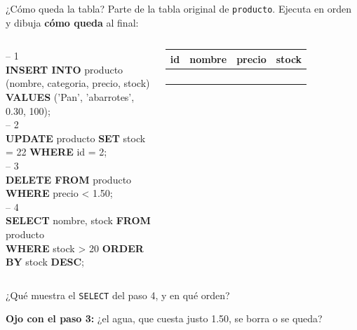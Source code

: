 \documentclass[aspectratio=169,10pt,c]{beamer}
\newcommand{\bl}[1][1.9cm]{\underline{\hspace{#1}}}
\newcommand{\tbl}[1]{\textcolor{utpNaranja}{\texttt{#1}}}
\newcommand{\kw}[1]{\textcolor{utpRojo}{\textbf{#1}}}
\newcommand{\com}[1]{\textcolor{utpGris}{-- #1}}
\newcommand{\ins}[1]{\tikz[baseline=-0.5ex]{\node[rounded corners=2pt,fill=utpRojo,text=white,
  font=\bfseries\scriptsize,inner xsep=5pt,inner ysep=2.5pt] {#1};}}
\newenvironment{sqlcode}[1][.86\textwidth]
  {\begin{center}\begin{lrbox}{\sqlbuf}\begin{minipage}{#1}\ttfamily\footnotesize\vspace{6pt}\raggedright}
  {\vspace{6pt}\end{minipage}\end{lrbox}\colorbox{utpGrisClaro}{\usebox{\sqlbuf}}\end{center}}
\begin{document}
\begin{frame}{\ins{Práctica 7} ¿Cómo queda la tabla?}
\small Parte de la tabla original de \tbl{producto}. Ejecuta en orden y dibuja \textbf{cómo queda} al final:
\vspace{0.2cm}
\begin{columns}[c,onlytextwidth]
\begin{sqlcode}[\textwidth]
\scriptsize
\com{1}\\
\kw{INSERT INTO} producto (nombre, categoria, precio, stock)\\
\kw{VALUES} ('Pan', 'abarrotes', 0.30, 100);\\[4pt]
\com{2}\\
\kw{UPDATE} producto \kw{SET} stock = 22 \kw{WHERE} id = 2;\\[4pt]
\com{3}\\
\kw{DELETE FROM} producto \kw{WHERE} precio < 1.50;\\[4pt]
\com{4}\\
\kw{SELECT} nombre, stock \kw{FROM} producto\\
\kw{WHERE} stock > 20 \kw{ORDER BY} stock \kw{DESC};
\end{sqlcode}
\centering\scriptsize
\begin{tabular}{p{0.4cm}p{1.2cm}p{0.7cm}p{0.7cm}}
\toprule
\bfseries id & \bfseries nombre & \bfseries precio & \bfseries stock \\
\midrule
\bl[0.3cm] & \bl[1.1cm] & \bl[0.6cm] & \bl[0.6cm] \\[6pt]
\bl[0.3cm] & \bl[1.1cm] & \bl[0.6cm] & \bl[0.6cm] \\[6pt]
\bl[0.3cm] & \bl[1.1cm] & \bl[0.6cm] & \bl[0.6cm] \\[6pt]
\bl[0.3cm] & \bl[1.1cm] & \bl[0.6cm] & \bl[0.6cm] \\
\bottomrule
\end{tabular}
\end{columns}
\vspace{0.3cm}
\small ¿Qué muestra el \texttt{SELECT} del paso 4, y en qué orden? \ \bl[4cm]
\vspace{0.1cm}

\small \textbf{Ojo con el paso 3:} ¿el agua, que cuesta justo 1.50, se borra o se queda?
\end{frame}
\end{document}
